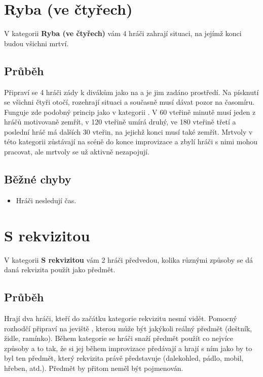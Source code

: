 \documentclass[main.tex]{subfiles}
\begin{document}
 
 
 
 
 
\needspace{5cm} \section{Ryba (ve čtyřech)} \label{ryba (ve čtyřech)}  
 
 
V kategorii \textbf{Ryba (ve čtyřech)}{} vám 4 hráči zahrají situaci, na jejímž konci budou všichni mrtví. 
 
\subsection{Průběh} Připraví se 4 hráči zády k divákům jako na  a je jim zadáno prostředí. Na písknutí  se všichni čtyři otočí, rozehrají situaci a současně musí dávat pozor na časomíru. Funguje zde podobný princip jako v kategorii . V 60 vteřině minutě musí jeden z hráčů motivovaně zemřít, v 120 vteřině umírá druhý, ve 180 vteřině třetí a poslední hráč má dalších 30 vteřin, na jejichž konci musí také zemřít. Mrtvoly v této kategorii zůstávají na scéně do konce improvizace a zbylí hráči s nimi mohou pracovat, ale mrtvoly se už aktivně nezapojují. 
 
\subsection{ Běžné chyby } \begin{itemize}
\item Hráči nesledují čas.
\end{itemize}
 
 
 
 
\needspace{5cm} \section{S rekvizitou} \label{s rekvizitou}  
 
V kategorii \textbf{S rekvizitou}{} vám 2 hráči předvedou, kolika různými způsoby se dá daná rekvizita použít jako předmět. 
 
\subsection{Průběh} Hrají dva hráči, kteří do začátku kategorie rekvizitu nesmí vidět. Pomocný rozhodčí připraví na jeviště , kterou může být jakýkoli reálný předmět (deštník, židle, ramínko). Během kategorie se hráči snaží předmět použít co nejvíce způsoby a to tak, že si jej během improvizace předávají a hrají s ním jako by to byl ten předmět, který rekvizita právě představuje (dalekohled, pádlo, mobil, hřeben, atd.).  Předmět by přitom neměl být pojmenován. 
 
\end{document}
